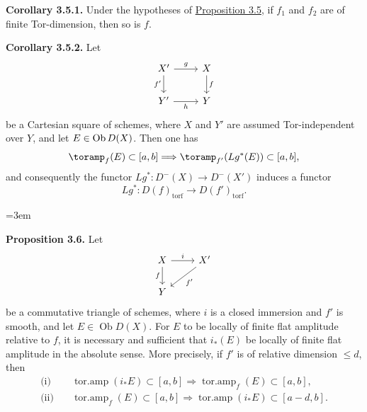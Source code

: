 \textbf{Corollary 3.5.1.} Under the hypotheses of \hyperlink{sga6.e03.prop.3-5}{Proposition 3.5}, if \(f_1\) and \(f_2\) are of finite Tor-dimension, then so is \(f\).

\textbf{Corollary 3.5.2.} Let
\[
\begin{tikzcd}
X' \arrow[r,"g"] \arrow[d,"f'"'] & X \arrow[d,"f"]\\
Y' \arrow[r,"h"'] & Y
\end{tikzcd}
\]
be a Cartesian square of schemes, where \(X\) and \(Y'\) are assumed Tor-independent over \(Y\), and let \(E\in \Ob D(X)\). Then one has
\[
  \toramp_f(E)\subset[a,b]\Longrightarrow
  \toramp_{f'}(Lg^*(E))\subset[a,b],
\]
and consequently the functor \(Lg^*:D^{-}(X)\to D^{-}(X')\) induces a functor
\[
  Lg^*:D(f)_{\mathrm{torf}}\longrightarrow D(f')_{\mathrm{torf}} .
\]



\providecommand{\Ob}{\operatorname{Ob}}
\providecommand{\D}{\mathrm D}
\providecommand{\Ho}{\mathrm H}
\providecommand{\RHom}{\mathrm R\!\operatorname{Hom}}
\providecommand{\parfamp}{\operatorname{parf.amp}}
\providecommand{\tamp}{\operatorname{tor.amp}}
\providecommand{\Qcoh}{\operatorname{Qcoh}}
\providecommand{\Mod}{\operatorname{Mod}}
\providecommand{\Coh}{\operatorname{Coh}}
\providecommand{\Lib}{\operatorname{Lib}}
\providecommand{\Loclib}{\operatorname{Loclib}}
\providecommand{\qcoh}{\mathrm{qcoh}}
\providecommand{\coh}{\mathrm{coh}}
\providecommand{\parf}{\mathrm{parf}}
\providecommand{\torf}{\mathrm{torf}}
\providecommand{\id}{\operatorname{id}}
\providecommand{\Coker}{\operatorname{Coker}}
\providecommand{\rank}{\operatorname{rank}}
\providecommand{\rg}{\operatorname{rg}}
\providecommand{\Hom}{\operatorname{Hom}}
\providecommand{\Ext}{\operatorname{Ext}}
\providecommand{\Spec}{\operatorname{Spec}}
\providecommand{\Cone}{\operatorname{Cone}}
\providecommand{\pt}{\operatorname{Pt}}
\providecommand{\ind}{\operatorname{ind}}
\hfuzz=20pt
\emergencystretch=3em

\textbf{Proposition 3.6.} Let
\[
\begin{tikzcd}
X \arrow[r,"i"] \arrow[d,"f"'] & X' \arrow[dl,"f'"]\\
Y &
\end{tikzcd}
\]
be a commutative triangle of schemes, where \(i\) is a closed immersion and \(f'\) is smooth, and let \(E\in\Ob D(X)\). For \(E\) to be locally of finite flat amplitude relative to \(f\), it is necessary and sufficient that \(i_*(E)\) be locally of finite flat amplitude in the absolute sense. More precisely, if \(f'\) is of relative dimension \(\leq d\), then
\begin{align*}
\text{(i)}\quad &\tamp(i_*E)\subset[a,b] \Longrightarrow \tamp_f(E)\subset[a,b],\\
\text{(ii)}\quad &\tamp_f(E)\subset[a,b] \Longrightarrow \tamp(i_*E)\subset[a-d,b].
\end{align*}

